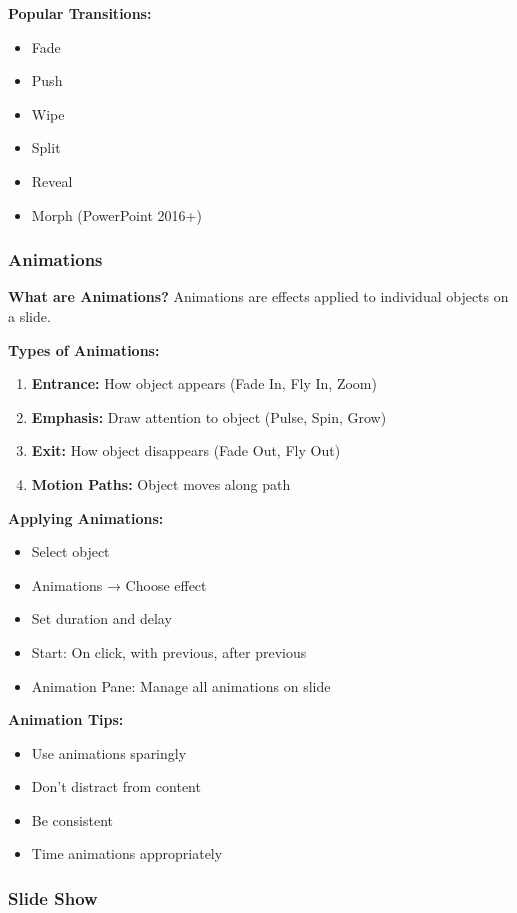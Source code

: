\documentclass[12pt,a4paper]{article}
\begin{document}
\textbf{Popular Transitions:}
\begin{itemize}
    \item Fade
    \item Push
    \item Wipe
    \item Split
    \item Reveal
    \item Morph (PowerPoint 2016+)
\end{itemize}

\subsubsection{Animations}

\textbf{What are Animations?}
Animations are effects applied to individual objects on a slide.

\textbf{Types of Animations:}
\begin{enumerate}
    \item \textbf{Entrance:} How object appears (Fade In, Fly In, Zoom)
    \item \textbf{Emphasis:} Draw attention to object (Pulse, Spin, Grow)
    \item \textbf{Exit:} How object disappears (Fade Out, Fly Out)
    \item \textbf{Motion Paths:} Object moves along path
\end{enumerate}

\textbf{Applying Animations:}
\begin{itemize}
    \item Select object
    \item Animations → Choose effect
    \item Set duration and delay
    \item Start: On click, with previous, after previous
    \item Animation Pane: Manage all animations on slide
\end{itemize}

\textbf{Animation Tips:}
\begin{itemize}
    \item Use animations sparingly
    \item Don't distract from content
    \item Be consistent
    \item Time animations appropriately
\end{itemize}

\subsubsection{Slide Show}
\end{document}
